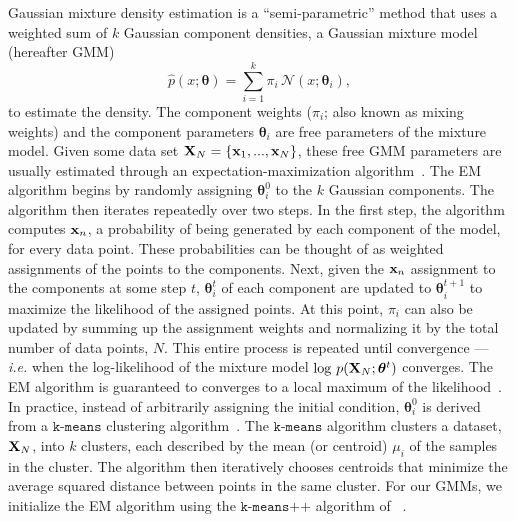 \documentclass[12pt, letterpaper, preprint]{aastex}
\newcommand{\beq}{\begin{equation}}
\newcommand{\eeq}{\end{equation}}
\newcommand{\gmm}{{\small{GMM}}\xspace}
\newcommand{\gmms}{{\small{GMM}s}\xspace}
\newcommand{\EM}{{\small{EM}}\xspace}
\begin{document}
Gaussian mixture density estimation is a ``semi-parametric'' method 
that uses a weighted sum of $k$ Gaussian component densities, a Gaussian 
mixture model (hereafter \gmm)
\beq
\widehat{p}(x; \bm{\theta}) = \sum\limits_{i=1}^{k} \pi_i\, \mathcal{N}(x; \bm{\theta}_i),
\eeq
to estimate the density. 
The component weights ($\pi_i$; also known as mixing weights) and the 
component parameters $\bm{\theta}_i$ are free parameters of the mixture 
model. Given some data set ${\bf X}_N = \{{\bf x}_1,..., {\bf x}_N \}$, 
these free \gmm parameters are usually estimated 
through an expectation-maximization algorithm~\citep[\EM;][]{dempster1977, neal1998}.
The \EM algorithm begins by randomly assigning $\bm{\theta}^0_i$ to the 
$k$ Gaussian components. The algorithm then iterates repeatedly over two steps. 
In the first step, the algorithm computes ${\bf x}_n$, 
a probability of being generated by each component of the model, for every data point. These 
probabilities can be thought of as weighted assignments of the points 
to the components. Next, given the ${\bf x}_n$ assignment to the 
components at some step $t$, $\bm{\theta}^t_i$ of each component are updated to $\bm{\theta}^{t+1}_i$
to maximize the likelihood of the assigned points. At this point, $\pi_i$ 
can also be updated by summing up the assignment weights and 
normalizing it by the total number of data points, $N$. This entire
process is repeated until convergence --- \emph{i.e.} when the log-likelihood of the
mixture model $\log\,p({\bf X}_N; \bm{\theta}^t)$ %
converges. The \EM algorithm is guaranteed to converges to a local maximum 
of the likelihood~\citep{wu1983}. In practice, instead of arbitrarily 
assigning the initial condition, $\bm{\theta}^0_i$ is derived from a $\texttt{k-means}$ 
clustering algorithm~\citep{lloyd1982}. The 
$\texttt{k-means}$ algorithm clusters a dataset, ${\bf X}_N$, into $k$ 
clusters, each described by the mean (or centroid) $\mu_i$ of the
samples in the cluster. The algorithm then iteratively chooses centroids that 
minimize the average squared distance between points in the same cluster.
For our \gmms, we initialize the \EM algorithm using 
the $\texttt{k-means++}$ algorithm of ~\cite{arthur2007}. 

\end{document}
